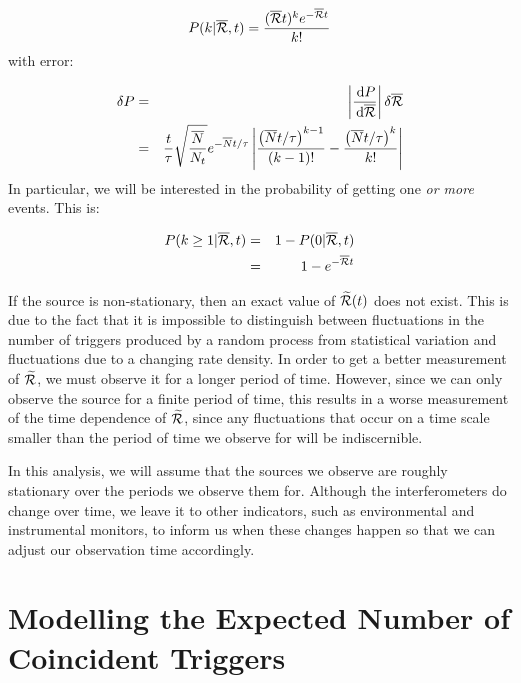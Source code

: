 \begin{equation}
\label{eqn:prob_Rt}
P(k|\overline{\RP},t) = \frac{(\overline{\RP} t)^k e^{-\overline{\RP} t}}{k!}
\end{equation}
with error:

\begin{eqnarray}
\label{eqn:err_rate_param}
\delta P & = & \left| \frac{\d{P}}{\d{\overline{\RP}}} \right| \delta \overline{\RP} \nonumber \\
         & = & \frac{t}{\tau}\sqrt{\frac{\overline{N}}{N_t}} e^{-\overline{N}t/\tau} \left| \frac{\left(\overline{N}t/\tau \right)^{k-1}}{\left( k-1 \right)!} - \frac{\left(\overline{N}t/\tau \right)^{k}}{k!} \right|
\end{eqnarray}
In particular, we will be interested in the probability of getting one \emph{or more} events. This is:

\begin{eqnarray}
\label{eqn:one_or_more}
P(k\geq1 | \overline{\RP},t) & = & 1 - P(0 | \overline{\RP},t) \nonumber \\
 & = & 1 - e^{-\overline{\RP}t}
 \end{eqnarray}

If the source is non-stationary, then an exact value of $\widetilde{\mathcal{R}}(t)$ does not
exist. This is due to the fact that it is impossible to distinguish between
fluctuations in the number of triggers produced by a random process from
statistical variation and fluctuations due to a changing rate density. In order
to get a better measurement of $\widetilde{\mathcal{R}}$, we must observe it for a longer period of
time. However, since we can only observe the source for a finite period of
time, this results in a worse measurement of the time dependence of $\widetilde{\mathcal{R}}$,
since any fluctuations that occur on a time scale smaller than the period of
time we observe for will be indiscernible. 

In this analysis, we will assume that the sources we observe are roughly
stationary over the periods we observe them for. Although the interferometers
do change over time, we leave it to other indicators, such as environmental and
instrumental monitors, to inform us when these changes happen so that we can
adjust our observation time accordingly.

\section{Modelling the Expected Number of Coincident Triggers}
\label{sec:coincidence_modelling}


